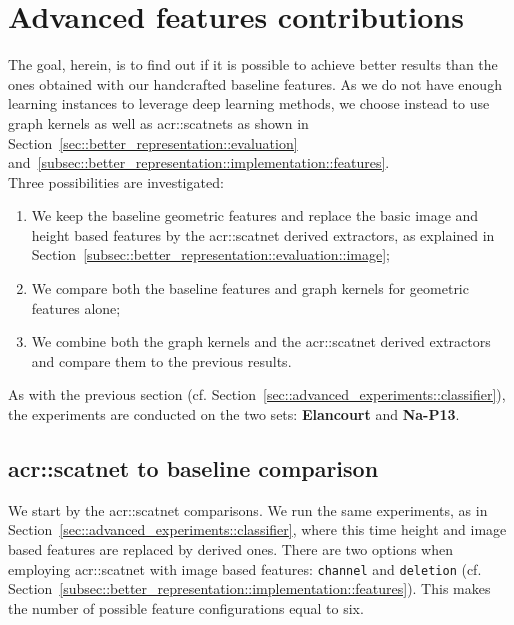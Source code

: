 \section{Advanced features contributions}
    \label{sec::advanced_experiments::better_features}
    The goal, herein, is to find out if it is possible to achieve better results than the ones obtained with our handcrafted baseline features.
    As we do not have enough learning instances to leverage deep learning methods, we choose instead to use graph kernels as well as \glspl{acr::scatnet} as shown in Section~\ref{sec::better_representation::evaluation} and~\ref{subsec::better_representation::implementation::features}.\\

    Three possibilities are investigated:
    \begin{enumerate}[label=\roman*)]
        \item We keep the baseline geometric features and replace the basic image and height based features by the \gls{acr::scatnet} derived extractors, as explained in Section~\ref{subsec::better_representation::evaluation::image};
        \item We compare both the baseline features and graph kernels for geometric features alone;
        \item We combine both the graph kernels and the \gls{acr::scatnet} derived extractors and compare them to the previous results.
    \end{enumerate}
    As with the previous section (cf. Section~\ref{sec::advanced_experiments::classifier}), the experiments are conducted on the two sets: \textbf{Elancourt} and \textbf{Na-P13}.

    \subsection{\texorpdfstring{\acrshort*{acr::scatnet}}{ScatNet} to baseline comparison}
        \label{subsec::advanced_experiments::better_features::scatnet_baseline}
        We start by the \gls{acr::scatnet} comparisons.
        We run the same experiments, as in Section~\ref{sec::advanced_experiments::classifier}, where this time height and image based features are replaced by derived ones.
        There are two options when employing \gls{acr::scatnet} with image based features: \texttt{channel} and \texttt{deletion} (cf. Section~\ref{subsec::better_representation::implementation::features}).
        This makes the number of possible feature configurations equal to six.\\

